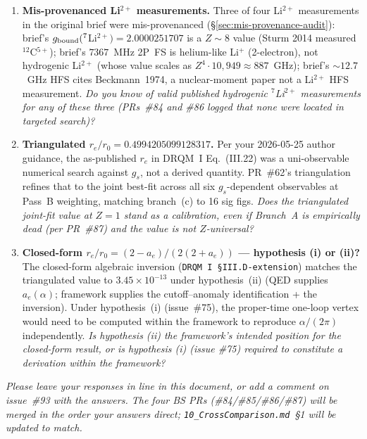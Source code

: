 \begin{enumerate}[leftmargin=*,label=Q\arabic*.]
\item \textbf{Mis-provenanced Li$^{2+}$ measurements.}
Three of four Li$^{2+}$ measurements in the original brief were
mis-provenanced (\S\ref{sec:mis-provenance-audit}): brief's
$g_{\rm bound}(^7$Li$^{2+}) = 2.0000251707$ is a $Z\!\sim\!8$ value (Sturm 2014
measured $^{12}$C$^{5+}$); brief's $7367$~MHz 2P~FS is helium-like Li$^+$
(2-electron), not hydrogenic Li$^{2+}$ (whose value scales as
$Z^4 \cdot 10{,}949 \approx 887$~GHz); brief's $\sim 12.7$~GHz HFS cites
Beckmann~1974, a nuclear-moment paper not a Li$^{2+}$ HFS measurement.
\emph{Do you know of valid published hydrogenic $^7$Li$^{2+}$ measurements
for any of these three (PRs~\#84 and \#86 logged that none were located in
targeted search)?}

\item \textbf{Triangulated $r_e/r_0 = 0.4994205099128317$.}
Per your 2026-05-25 author guidance, the as-published $r_e$ in DRQM~I
Eq.~(III.22) was a uni-observable numerical search against $g_s$, not a
derived quantity. PR~\#62's triangulation refines that to the joint
best-fit across all six $g_s$-dependent observables at Pass~B weighting,
matching branch~(c) to 16 sig figs.
\emph{Does the triangulated joint-fit value at $Z=1$ stand as a
calibration, even if Branch~A is empirically dead (per PR~\#87) and the
value is not $Z$-universal?}

\item \textbf{Closed-form $r_e/r_0 = (2 - a_e)/(2(2 + a_e))$ ---
hypothesis (i) or (ii)?}
The closed-form algebraic inversion (\texttt{DRQM~I~\S III.D-extension})
matches the triangulated value to $3.45\times 10^{-13}$ under hypothesis~(ii)
(QED supplies $a_e(\alpha)$; framework supplies the cutoff--anomaly
identification + the inversion). Under hypothesis~(i) (issue~\#75), the
proper-time one-loop vertex would need to be computed within the framework
to reproduce $\alpha/(2\pi)$ independently.
\emph{Is hypothesis (ii) the framework's intended position for the
closed-form result, or is hypothesis (i) (issue \#75) required to constitute
a derivation \emph{within} the framework?}

\end{enumerate}

\bigskip

\noindent\textit{Please leave your responses in line in this document, or
add a comment on issue~\#93 with the answers. The four BS PRs
(\#84/\#85/\#86/\#87) will be merged in the order your answers direct;
\texttt{10\_CrossComparison.md}~\S1 will be updated to match.}
